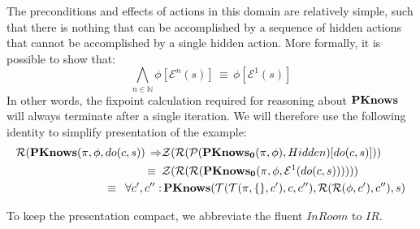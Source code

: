 The preconditions and effects of actions in this domain are relatively
simple, such that there is nothing that can be accomplished by a sequence
of hidden actions that cannot be accomplished by a single hidden action.
More formally, it is possible to show that:\[
\bigwedge_{n\in\mathbb{N}}\phi[\mathcal{E}^{n}(s)]\,\equiv\,\phi[\mathcal{E}^{1}(s)]\]
 In other words, the fixpoint calculation required for reasoning about
$\mathbf{PKnows}$ will always terminate after a single iteration. We will
therefore use the following identity to simplify presentation of the
example:\begin{align*}
\mathcal{R}(\mathbf{PKnows}(\pi,\phi,do(c,s))\,\Rightarrow & \mathcal{Z}(\mathcal{R}(\mathcal{P}(\mathbf{PKnows_{0}}(\pi,\phi),Hidden)[do(c,s)]))\\
\equiv\,\,\, & \mathcal{Z}(\mathcal{R}(\mathcal{R}(\mathbf{PKnows_{0}}(\pi,\phi,\mathcal{E}^{1}(do(c,s))))))\\
\equiv\,\,\,\forall c',c'': & \,\mathbf{PKnows}(\mathcal{T}(\mathcal{T}(\pi,\{\},c'),c,c''),\mathcal{R}(\mathcal{R}(\phi,c'),c''),s)\end{align*}


To keep the presentation compact, we abbreviate the fluent $InRoom$
to $IR$.

